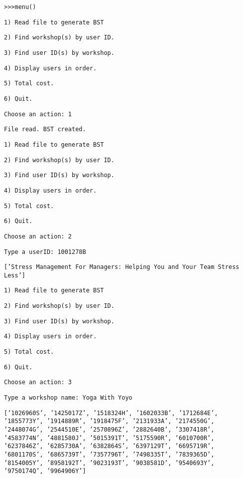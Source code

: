 \noindent\begin{minipage}[t]{1\columnwidth}%
\texttt{>\textcompwordmark >\textcompwordmark >menu()}

\texttt{1) Read file to generate BST }

\texttt{2) Find workshop(s) by user ID.}

\texttt{3) Find user ID(s) by workshop.}

\texttt{4) Display users in order. }

\texttt{5) Total cost. }

\texttt{6) Quit. }

\texttt{Choose an action: 1}

\texttt{File read. BST created. }

\texttt{1) Read file to generate BST}

\texttt{2) Find workshop(s) by user ID. }

\texttt{3) Find user ID(s) by workshop. }

\texttt{4) Display users in order. }

\texttt{5) Total cost. }

\texttt{6) Quit. }

\texttt{Choose an action: 2 }

\texttt{Type a userID: 1001278B}

\texttt{{[}'Stress Management For Managers: Helping You and Your Team
Stress Less'{]} }

\texttt{1) Read file to generate BST }

\texttt{2) Find workshop(s) by user ID. }

\texttt{3) Find user ID(s) by workshop.}

\texttt{4) Display users in order.}

\texttt{5) Total cost. }

\texttt{6) Quit. }

\texttt{Choose an action: 3}

\texttt{Type a workshop name: Yoga With Yoyo }

\texttt{{[}'1026960S', '1425017Z', '1518324H', '1602033B', '1712684E',
'1855773Y', '1914889R', '1918475F', '2131933A', '2174550G', '2448074G',
'2544510E', '2570896Z', '2882640B', '3307418R', '4583774N', '4881580J',
'5015391T', '5175590R', '6010700R', '6237846Z', '6285730A', '6382864S',
'6397129T', '6695719R', '6801170S', '6865739T', '7357796T', '7498335T',
'7839365D', '8154005Y', '8958192T', '9023193T', '9038581D', '9540693Y',
'9750174Q', '9964906Y'{]} }


\end{minipage}
